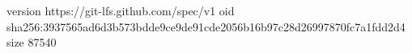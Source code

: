 version https://git-lfs.github.com/spec/v1
oid sha256:3937565ad6d3b573bdde9ce9de91cde2056b16b97c28d26997870fc7a1fdd2d4
size 87540

